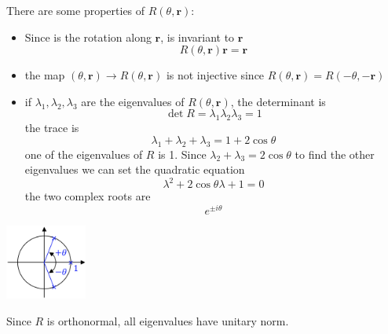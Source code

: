 \documentclass[10pt, letterpaper]{report}
\begin{document}
There are some properties of $ R(\theta,\mathbf r)$:\begin{itemize}
    \item Since is the rotation along $\mathbf r$, is invariant to $\mathbf r$\begin{equation}
         R(\theta,\mathbf r)\mathbf r = \mathbf r
    \end{equation}
    \item the map $(\theta,\mathbf r)\rightarrow  R(\theta,\mathbf r)$ is not injective since $R(\theta,\mathbf r)=R(-\theta,-\mathbf r)$
    \item if $\lambda_1,\lambda_2,\lambda_3$ are the eigenvalues of $R(\theta,\mathbf r)$, the determinant is\begin{equation}
        \det R = \lambda_1\lambda_2\lambda_3=1
    \end{equation}
    the trace is \begin{equation}
        \lambda_1+\lambda_2+\lambda_3=1+2\cos\theta
    \end{equation}
    one of the eigenvalues of $R$ is 1. Since $\lambda_2+\lambda_3=2\cos\theta$
    to find the other eigenvalues we can set the quadratic equation\begin{equation}
        \lambda^2+2\cos\theta\lambda+1=0 
    \end{equation}
    the two complex roots are\begin{equation}
        e^{\pm i\theta}
    \end{equation}
\end{itemize}\begin{center}
    \includegraphics[width=0.2\textwidth ]{images/eigenvalues.png}
\end{center}
Since $R$ is orthonormal, all eigenvalues have unitary norm.
\end{document}
